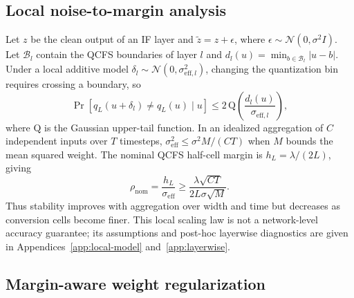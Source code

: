\documentclass{article}
\begin{document}
\subsection{Local noise-to-margin analysis}

Let $z$ be the clean output of an IF layer and $\tilde z=z+\epsilon$, where $\epsilon\sim\mathcal{N}(0,\sigma^2 I)$. Let $\mathcal{B}_l$ contain the QCFS boundaries of layer $l$ and $d_l(u)=\min_{b\in\mathcal{B}_l}|u-b|$. Under a local additive model $\delta_l\sim\mathcal{N}(0,\sigma_{\mathrm{eff},l}^2)$, changing the quantization bin requires crossing a boundary, so
\begin{equation}
\Pr[q_L(u+\delta_l)\neq q_L(u)\mid u]
\leq 2\,\mathrm{Q}\!\left(\frac{d_l(u)}{\sigma_{\mathrm{eff},l}}\right),
\label{eq:crossing-bound}
\end{equation}
where $\mathrm{Q}$ is the Gaussian upper-tail function. In an idealized aggregation of $C$ independent inputs over $T$ timesteps, $\sigma_{\mathrm{eff}}^2\leq\sigma^2M/(CT)$ when $M$ bounds the mean squared weight. The nominal QCFS half-cell margin is $h_L=\lambda/(2L)$, giving
\begin{equation}
\rho_{\mathrm{nom}}=\frac{h_L}{\sigma_{\mathrm{eff}}}
\geq \frac{\lambda\sqrt{CT}}{2L\sigma\sqrt{M}}.
\label{eq:nominal-stability}
\end{equation}
Thus stability improves with aggregation over width and time but decreases as conversion cells become finer. This local scaling law is not a network-level accuracy guarantee; its assumptions and post-hoc layerwise diagnostics are given in Appendices~\ref{app:local-model} and~\ref{app:layerwise}.

\subsection{Margin-aware weight regularization}
\end{document}
